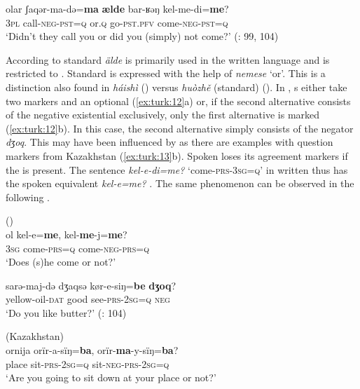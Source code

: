     \ex
    \gll olar  ʃaqər-ma-də=\textbf{{ma}} \textbf{{ælde}} bar-ʁəŋ  kel-me-di=\textbf{{me}}?\\
    3\textsc{pl}  call-\textsc{neg}-\textsc{pst}=\textsc{q}  or.\textsc{q}  go-\textsc{pst.pfv}  come-\textsc{neg}-\textsc{pst}=\textsc{q}\\
    \glt ‘Didn’t they call you or did you (simply) not come?’ (\citealt{ZhangDingjing1991}: 99, 104)\z\z

According to \citet[65]{Muhamedowa2016} standard  \textit{älde} is primarily used in the written language and is restricted to . Standard  is expressed with the help of \textit{nemese} ‘or’. This is a distinction also found in   \textit{háishì}  () versus \textit{huòzhě}  (standard) (). In  , s either take two markers and an optional  (\ref{ex:turk:12}a) or, if the second alternative consists of the negative existential exclusively, only the first alternative is marked (\ref{ex:turk:12}b). In this case, the second alternative simply consists of the negator \textit{dʒoq}. This may have been influenced by  as there are examples with question markers from Kazakhstan (\ref{ex:turk:13}b). Spoken  loses its agreement markers if the  is present. The sentence \textit{kel-e-di=me?} ‘come-\textsc{prs}-3\textsc{sg}=\textsc{q}’ in written  thus has the spoken equivalent \textit{kel-e=me?} \citep[168]{Muhamedowa2016}. The same phenomenon can be observed in the following .

\ea%
    \label{ex:turk:12}
     ()\\
    \ea
    \gll ol  kel-e=\textbf{{me}},  kel-\textbf{{me}}{-j=}\textbf{{me}}?\\
    3\textsc{sg}  come-\textsc{prs}=\textsc{q}  come-\textsc{neg-prs}=\textsc{q}\\
    \glt ‘Does (s)he come or not?’
    
    \ex
    \gll sarə-maj-də    dʒaqsə    kør-e-siŋ=\textbf{{be}} \textbf{{dʒoq}}?\\
    yellow-oil-\textsc{dat}    good    see-\textsc{prs}-2\textsc{sg}=\textsc{q}  \textsc{neg}\\
    \glt ‘Do you like butter?’ (\citealt{ZhangDingjing1991}: 104)
    \z
    \z

\ea%
    \label{ex:turk:13}
     (Kazakhstan)\\
    \ea
    \gll ornija  orïr-a-sïŋ=\textbf{{ba}},    orïr-\textbf{{ma}}{-y-sïŋ=}\textbf{{ba}}?\\
    place  sit-\textsc{prs}-2\textsc{sg}=\textsc{q}    sit-\textsc{neg}-\textsc{prs}-2\textsc{sg}=\textsc{q}\\
    \glt ‘Are you going to sit down at your place or not?’
    
